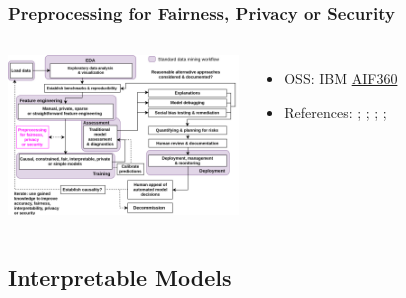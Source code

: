 \documentclass[11pt,
               aspectratio=169,
               hyperref={colorlinks}
               ]{beamer}
\begin{document}
			\begin{frame}
		
				\frametitle{Preprocessing for Fairness, Privacy or Security}		
			
				\begin{columns}
	
					\centering
					\includegraphics[height=120pt]{../img/pre.png}
				
					\vspace{-5pt}
					\begin{itemize}
						\item OSS: IBM \href{https://github.com/IBM/AIF360}{AIF360}
						\item References: ; ; ; ; 
					\end{itemize}
				
				\end{columns}			
			
			\end{frame}
			
		\subsection{Interpretable Models}
			
\end{document}
